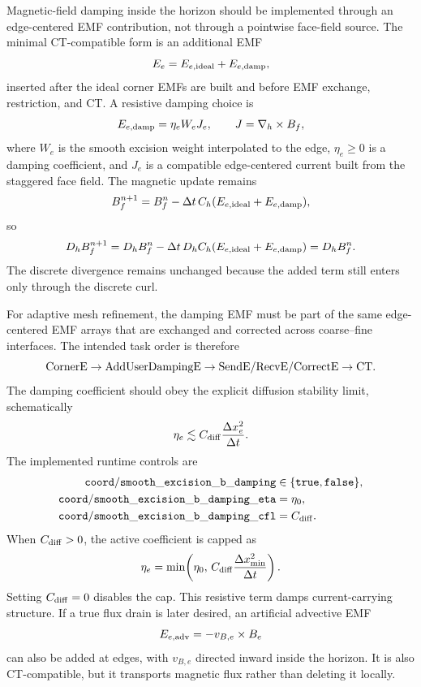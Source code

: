 \documentclass[11pt]{article}
\begin{document}
Magnetic-field damping inside the horizon should be implemented through an
edge-centered EMF contribution, not through a pointwise face-field source.
The minimal CT-compatible form is an additional EMF
\begin{equation}
  E_e = E_{e,{\rm ideal}} + E_{e,{\rm damp}},
\end{equation}
inserted after the ideal corner EMFs are built and before EMF exchange,
restriction, and CT.  A resistive damping choice is
\begin{equation}
  E_{e,{\rm damp}} = \eta_e W_e J_e,
  \qquad
  J = \nabla_h \times B_f ,
\end{equation}
where \(W_e\) is the smooth excision weight interpolated to the edge,
\(\eta_e \ge 0\) is a damping coefficient, and \(J_e\) is a compatible
edge-centered current built from the staggered face field.  The magnetic
update remains
\begin{equation}
  B_f^{n+1}
  =
  B_f^n
  -
  \Delta t\, C_h(E_{e,{\rm ideal}} + E_{e,{\rm damp}}),
\end{equation}
so
\begin{equation}
  D_h B_f^{n+1}
  =
  D_h B_f^n
  -
  \Delta t\,D_h C_h(E_{e,{\rm ideal}} + E_{e,{\rm damp}})
  =
  D_h B_f^n .
\end{equation}
The discrete divergence remains unchanged because the added term still
enters only through the discrete curl.

For adaptive mesh refinement, the damping EMF must be part of the same
edge-centered EMF arrays that are exchanged and corrected across coarse--fine
interfaces.  The intended task order is therefore
\begin{equation}
  {\rm CornerE}
  \rightarrow
  {\rm AddUserDampingE}
  \rightarrow
  {\rm SendE/RecvE/CorrectE}
  \rightarrow
  {\rm CT}.
\end{equation}
The damping coefficient should obey the explicit diffusion stability limit,
schematically
\begin{equation}
  \eta_e \lesssim C_{\rm diff}\frac{\Delta x_e^2}{\Delta t}.
\end{equation}
The implemented runtime controls are
\begin{align}
  {\tt coord/smooth\_excision\_b\_damping} &\in \{{\tt true},{\tt false}\},\\
  {\tt coord/smooth\_excision\_b\_damping\_eta} &= \eta_0,\\
  {\tt coord/smooth\_excision\_b\_damping\_cfl} &= C_{\rm diff}.
\end{align}
When \(C_{\rm diff}>0\), the active coefficient is capped as
\begin{equation}
  \eta_e =
  \min\!\left(\eta_0,\,
  C_{\rm diff}\frac{\Delta x_{\min}^2}{\Delta t}\right).
\end{equation}
Setting \(C_{\rm diff}=0\) disables the cap.
This resistive term damps current-carrying structure.  If a true flux drain
is later desired, an artificial advective EMF
\begin{equation}
  E_{e,{\rm adv}} = -v_{B,e}\times B_e
\end{equation}
can also be added at edges, with \(v_{B,e}\) directed inward inside the
horizon.  It is also CT-compatible, but it transports magnetic flux rather
than deleting it locally.
\end{document}
